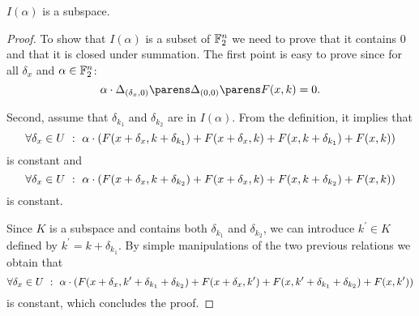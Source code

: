 \begin{lemma}\label{lem:Ialpha-subspace}
    $I(\alpha)$ is a subspace.
\end{lemma}
\begin{proof}
    To show that $I(\alpha)$ is a subset of $\mathbb{F}_2^n$ we need to prove that it contains $0$ and that it is closed under summation.
    The first point is easy to prove since for all $\delta_x$ and $\alpha \in \mathbb{F}_2^n$:
    \begin{equation*}
        \iprod{\alpha}{\derive{(\delta_x, 0)}{\derive{(0, 0)}{F}}(x, k)} = 0.
    \end{equation*}

    Second, assume that $\delta_{k_1}$ and $\delta_{k_2}$ are in $I(\alpha)$.
    From the definition, it implies that
    \begin{equation*}
        \forall \delta_x \in U\ :\ \iprod{\alpha}{(F(x+\delta_x, k+\delta_{k_1})+F(x+\delta_x, k)+F(x, k+\delta_{k_1})+F(x, k))}
    \end{equation*}
    is constant and
    \begin{equation*}
        \forall \delta_x \in U\ :\ \iprod{\alpha}{(F(x+\delta_x, k+\delta_{k_2})+F(x+\delta_x, k)+F(x, k+\delta_{k_2})+F(x, k))}
    \end{equation*}
    is constant.

    Since $K$ is a subspace and contains both $\delta_{k_1}$ and $\delta_{k_2}$, we can introduce $k^\prime \in K$ defined by $k^\prime = k +\delta_{k_1}$.
    By simple manipulations of the two previous relations we obtain that
    \begin{equation*}
        \forall \delta_x \in U\ :\ \iprod{\alpha}{(F(x+\delta_x, k^\prime+\delta_{k_1}+\delta_{k_2})+F(x+\delta_x, k^\prime)+F(x, k^\prime+\delta_{k_1}+\delta_{k_2})+F(x, k^\prime))}
    \end{equation*}
    is constant, which concludes the proof.
\end{proof}

